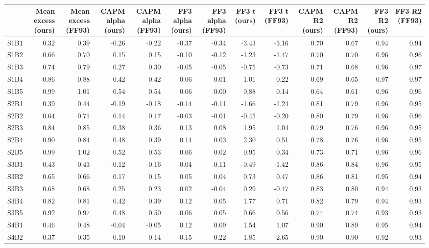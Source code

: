 \begin{tabular}{lrrrrrrrrrrrr}
\toprule
 & Mean excess (ours) & Mean excess (FF93) & CAPM alpha (ours) & CAPM alpha (FF93) & FF3 alpha (ours) & FF3 alpha (FF93) & FF3 t (ours) & FF3 t (FF93) & CAPM R2 (ours) & CAPM R2 (FF93) & FF3 R2 (ours) & FF3 R2 (FF93) \\
\midrule
S1B1 & 0.32 & 0.39 & -0.26 & -0.22 & -0.37 & -0.34 & -3.43 & -3.16 & 0.70 & 0.67 & 0.94 & 0.94 \\
S1B2 & 0.66 & 0.70 & 0.15 & 0.15 & -0.10 & -0.12 & -1.23 & -1.47 & 0.70 & 0.70 & 0.96 & 0.96 \\
S1B3 & 0.74 & 0.79 & 0.27 & 0.30 & -0.05 & -0.05 & -0.75 & -0.73 & 0.71 & 0.68 & 0.96 & 0.97 \\
S1B4 & 0.86 & 0.88 & 0.42 & 0.42 & 0.06 & 0.01 & 1.01 & 0.22 & 0.69 & 0.65 & 0.97 & 0.97 \\
S1B5 & 0.99 & 1.01 & 0.54 & 0.54 & 0.06 & 0.00 & 0.88 & 0.14 & 0.64 & 0.61 & 0.96 & 0.96 \\
S2B1 & 0.39 & 0.44 & -0.19 & -0.18 & -0.14 & -0.11 & -1.66 & -1.24 & 0.81 & 0.79 & 0.96 & 0.95 \\
S2B2 & 0.64 & 0.71 & 0.14 & 0.17 & -0.03 & -0.01 & -0.45 & -0.20 & 0.80 & 0.79 & 0.96 & 0.96 \\
S2B3 & 0.84 & 0.85 & 0.38 & 0.36 & 0.13 & 0.08 & 1.95 & 1.04 & 0.79 & 0.76 & 0.96 & 0.95 \\
S2B4 & 0.90 & 0.84 & 0.48 & 0.39 & 0.14 & 0.03 & 2.30 & 0.51 & 0.78 & 0.76 & 0.96 & 0.95 \\
S2B5 & 0.99 & 1.02 & 0.52 & 0.53 & 0.06 & 0.02 & 0.95 & 0.34 & 0.73 & 0.71 & 0.96 & 0.96 \\
S3B1 & 0.43 & 0.43 & -0.12 & -0.16 & -0.04 & -0.11 & -0.49 & -1.42 & 0.86 & 0.84 & 0.96 & 0.95 \\
S3B2 & 0.65 & 0.66 & 0.17 & 0.15 & 0.05 & 0.04 & 0.73 & 0.47 & 0.86 & 0.81 & 0.95 & 0.94 \\
S3B3 & 0.68 & 0.68 & 0.25 & 0.23 & 0.02 & -0.04 & 0.29 & -0.47 & 0.83 & 0.80 & 0.94 & 0.93 \\
S3B4 & 0.82 & 0.81 & 0.42 & 0.39 & 0.12 & 0.05 & 1.77 & 0.71 & 0.82 & 0.79 & 0.94 & 0.93 \\
S3B5 & 0.92 & 0.97 & 0.48 & 0.50 & 0.06 & 0.05 & 0.66 & 0.56 & 0.74 & 0.74 & 0.93 & 0.93 \\
S4B1 & 0.46 & 0.48 & -0.04 & -0.05 & 0.12 & 0.09 & 1.54 & 1.07 & 0.90 & 0.89 & 0.95 & 0.94 \\
S4B2 & 0.37 & 0.35 & -0.10 & -0.14 & -0.15 & -0.22 & -1.85 & -2.65 & 0.90 & 0.90 & 0.92 & 0.93 \\

\end{tabular}
